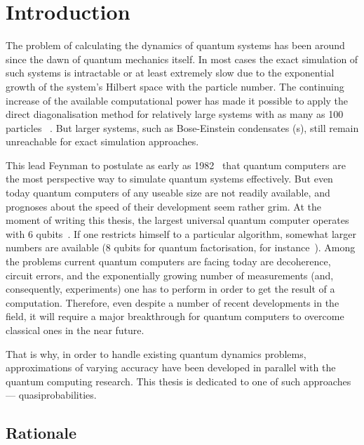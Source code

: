 \chapter{Introduction}

The problem of calculating the dynamics of quantum systems has been around since the dawn of quantum mechanics itself.
In most cases the exact simulation of such systems is intractable or at least extremely slow due to the exponential growth of the system's Hilbert space with the particle number.
The continuing increase of the available computational power has made it possible to apply the direct diagonalisation method for relatively large systems with as many as 100 particles~\cite{Sakmann2009} .
But larger systems, such as Bose-Einstein condensates (s), still remain unreachable for exact simulation approaches.

This lead Feynman to postulate as early as 1982~\cite{Feynman1982} that quantum computers are the most perspective way to simulate quantum systems effectively.
But even today quantum computers of any useable size are not readily available, and prognoses about the speed of their development seem rather grim.
At the moment of writing this thesis, the largest universal quantum computer operates with 6 qubits~\cite{Lanyon2011}.
If one restricts himself to a particular algorithm, somewhat larger numbers are available (8 qubits for quantum factorisation, for instance~\cite{Xu2012}).
Among the problems current quantum computers are facing today are decoherence, circuit errors, and the exponentially growing number of measurements (and, consequently, experiments) one has to perform in order to get the result of a computation.
Therefore, even despite a number of recent developments in the field, it will require a major breakthrough for quantum computers to overcome classical ones in the near future.

That is why, in order to handle existing quantum dynamics problems, approximations of varying accuracy have been developed in parallel with the quantum computing research.
This thesis is dedicated to one of such approaches --- quasiprobabilities.


\section{Rationale}

